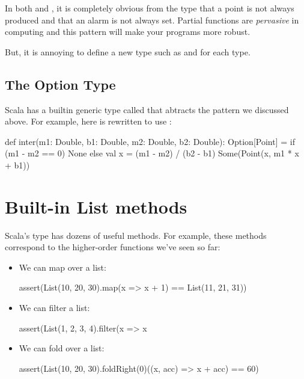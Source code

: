 \documentclass[9pt]{extbook}
\begin{document}
In both  and , it is completely
obvious from the type that a point is not always produced and that an alarm is
not always set. Partial functions are \emph{pervasive} in computing and this pattern
will make your programs more robust.

But, it is annoying to define a new type such as 
and  for each type.

\subsection{The Option Type}

Scala has a builtin generic type called  that abtracts the
pattern we discussed above. For example, here is  rewritten
to use :

\begin{scalacode}
def inter(m1: Double, b1: Double, m2: Double, b2: Double): Option[Point] = {
  if (m1 - m2 == 0) {
    None
  }
  else {
    val x = (m1 - m2) / (b2 - b1)
    Some(Point(x, m1 * x + b1))
  }
}
\end{scalacode}

\section{Built-in List methods}

Scala's  type has dozens of useful methods. For example,
these methods correspond to the higher-order functions we've seen so far:
%
\begin{itemize}

  \item We can map over a list:

  \begin{scalacode}
  assert(List(10, 20, 30).map(x => x + 1) == List(11, 21, 31))
  \end{scalacode}

  \item We can filter a list:

  \begin{scalacode}
  assert(List(1, 2, 3, 4).filter(x => x %
  \end{scalacode}

  \item We can fold over a list:

  \begin{scalacode}
  assert(List(10, 20, 30).foldRight(0)((x, acc) => x + acc) == 60)
  \end{scalacode}

\end{itemize}
\end{document}
